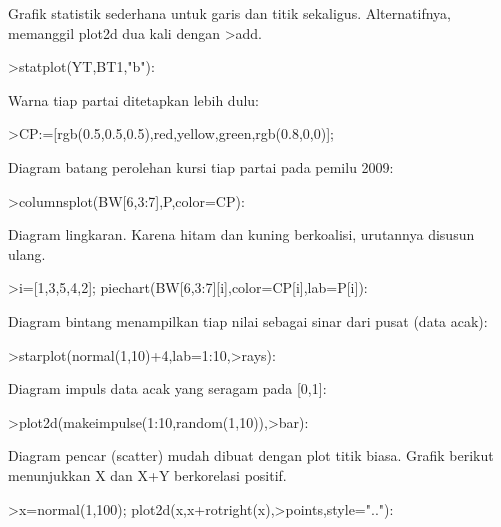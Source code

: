 \documentclass[a4paper,10pt]{article}
\begin{document}
\begin{eulernotebook}
\begin{eulercomment}
\begin{eulercomment}
\begin{eulercomment}
\begin{eulercomment}
\begin{eulercomment}
\begin{eulercomment}
\begin{eulercomment}
\begin{eulercomment}
\begin{eulercomment}
\begin{eulercomment}
\begin{eulercomment}
\begin{eulercomment}
\begin{eulercomment}
\begin{eulercomment}
\begin{euleroutput}
  [84.29,  81.25,  81.166,  82.753,  72.964,  61.897,  79.873]
\end{euleroutput}
\begin{eulercomment}
Grafik statistik sederhana untuk garis dan titik sekaligus. Alternatifnya, memanggil plot2d
dua kali dengan \textgreater{}add.
\end{eulercomment}
\begin{eulerprompt}
>statplot(YT,BT1,"b"):
\end{eulerprompt}
\begin{eulercomment}
Warna tiap partai ditetapkan lebih dulu:
\end{eulercomment}
\begin{eulerprompt}
>CP:=[rgb(0.5,0.5,0.5),red,yellow,green,rgb(0.8,0,0)];
\end{eulerprompt}
\begin{eulercomment}
Diagram batang perolehan kursi tiap partai pada pemilu 2009:
\end{eulercomment}
\begin{eulerprompt}
>columnsplot(BW[6,3:7],P,color=CP):
\end{eulerprompt}
\begin{eulercomment}
Diagram lingkaran. Karena hitam dan kuning berkoalisi, urutannya disusun ulang.
\end{eulercomment}
\begin{eulerprompt}
>i=[1,3,5,4,2]; piechart(BW[6,3:7][i],color=CP[i],lab=P[i]):
\end{eulerprompt}
\begin{eulercomment}
Diagram bintang menampilkan tiap nilai sebagai sinar dari pusat (data acak):
\end{eulercomment}
\begin{eulerprompt}
>starplot(normal(1,10)+4,lab=1:10,>rays):
\end{eulerprompt}
\begin{eulercomment}
Diagram impuls data acak yang seragam pada [0,1]:
\end{eulercomment}
\begin{eulerprompt}
>plot2d(makeimpulse(1:10,random(1,10)),>bar):
\end{eulerprompt}
\begin{eulercomment}
Diagram pencar (scatter) mudah dibuat dengan plot titik biasa. Grafik berikut menunjukkan
X dan X+Y berkorelasi positif.
\end{eulercomment}
\begin{eulerprompt}
>x=normal(1,100); plot2d(x,x+rotright(x),>points,style=".."):

\end{eulerprompt}
\end{eulercomment}
\end{eulercomment}
\end{eulercomment}
\end{eulercomment}
\end{eulercomment}
\end{eulercomment}
\end{eulercomment}
\end{eulercomment}
\end{eulercomment}
\end{eulercomment}
\end{eulercomment}
\end{eulercomment}
\end{eulercomment}
\end{eulercomment}
\end{eulernotebook}
\end{document}
